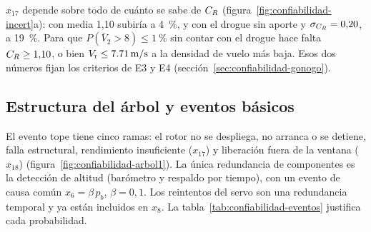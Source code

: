 $x_{17}$ depende sobre todo de cuánto se sabe de $C_{R}$
(figura~\ref{fig:confiabilidad-incert}a): con media 1,10 subiría a \SI{4}{\percent}, y con
el drogue sin aporte y $\sigma_{C_{R}}=0{,}20$, a \SI{19}{\percent}. Para que
$P(\bar V_2>8)\le\SI{1}{\percent}$ sin contar con el drogue hace falta $C_{R}\ge1{,}10$, o
bien $V_{\mathrm{r}}\le\SI{7.71}{m/s}$ a la densidad de vuelo más baja. Esos dos números fijan los criterios
de E3 y E4 (sección~\ref{sec:confiabilidad-gonogo}).

\subsection{Estructura del árbol y eventos básicos}
El evento tope tiene cinco ramas: el rotor no se despliega, no arranca o se detiene,
falla estructural, rendimiento insuficiente ($x_{17}$) y liberación fuera de la ventana
($x_{18}$) (figura~\ref{fig:confiabilidad-arbol1}). La única redundancia de componentes es la
detección de altitud (barómetro y respaldo por tiempo), con un evento de causa común
$x_6=\beta\,p_b$, $\beta=0{,}1$. Los reintentos del servo son una redundancia temporal y ya
están incluidos en $x_8$. La tabla~\ref{tab:confiabilidad-eventos} justifica cada
probabilidad.

